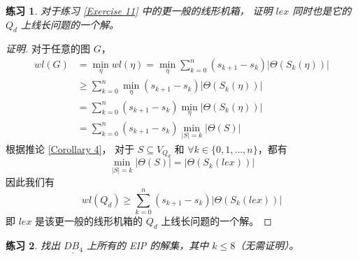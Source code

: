 \documentclass[12pt, a4paper]{article}
\newtheorem{exercisewithanswer}{练习}
\begin{document}
\begin{exercisewithanswer}
对于练习 \ref{Exercise 11} 中的更一般的线形机箱，
证明 $lex$ 同时也是它的 $Q_d$ 上线长问题的一个解。
\end{exercisewithanswer}

\begin{proof}[证明]
对于任意的图 $G$，
\begin{align*}
wl(G) & = \min_{\eta} wl(\eta)
	= \min_{\eta} \sum_{k = 0}^n (s_{k + 1} - s_k) |\Theta(S_k(\eta))| \\
      & \ge \sum_{k = 0}^n \min_{\eta} (s_{k + 1} - s_k) |\Theta(S_k(\eta))| \\
      & = \sum_{k = 0}^n (s_{k + 1} - s_k) \min_{\eta} |\Theta(S_k(\eta))| \\
      & = \sum_{k = 0}^n (s_{k + 1} - s_k) \min_{|S| = k} |\Theta(S)|
\end{align*}
根据推论 \ref{Corollary 4}，
对于 $S \subseteq V_{Q_d}$ 和 $\forall k \in \{0, 1, \dots, n\}$，都有
\begin{equation*}
\min_{|S| = k} |\Theta(S)| = |\Theta(S_k(lex))|
\end{equation*}
因此我们有
\begin{equation*}
wl(Q_d) \ge \sum_{k = 0}^n (s_{k + 1} - s_k) |\Theta(S_k(lex))|
\end{equation*}
即 $lex$ 是该更一般的线形机箱的 $Q_d$ 上线长问题的一个解。
\end{proof}

\begin{exercisewithanswer}
找出 $\underline{DB_4}$ 上所有的 EIP 的解集，其中 $k \le 8$（无需证明）。
\end{exercisewithanswer}
\end{document}

